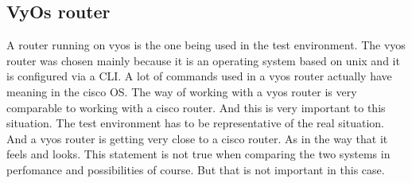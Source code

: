 \subsection { VyOs router }
A router running on vyos is the one being used in the test environment. The vyos router was chosen mainly because it is an operating system based on unix and it is configured via a CLI.
A lot of commands used in a vyos router actually have meaning in the cisco OS. The way of working with a vyos router is very comparable to working with a cisco router. And this is very important  to this situation. The test environment has to be representative of the real situation. And a vyos router is getting very close to a cisco router. As in the way that it feels and looks. This statement is not true when comparing the two systems in perfomance and possibilities of course. But that is not important in this case.



